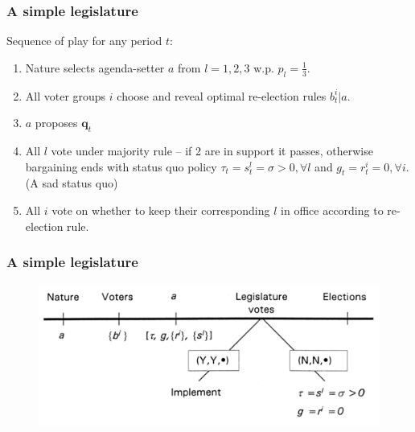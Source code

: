 \documentclass[11pt,aspectratio=169]{beamer}
\begin{document}
\begin{frame}
\frametitle{A simple legislature}


\noindent Sequence of play for any period $t$:

\begin{enumerate}
\item Nature selects agenda-setter $a$ from $l=1,2,3$ w.p. $p_l=\frac{1}{3}$. 

\item All voter groups $i$ choose and reveal optimal re-election rules $b_t^i|a$. 

\item $a$ proposes $\textbf{q}_t$

\item All $l$ vote under majority rule -- if 2 are in support it passes, otherwise bargaining ends with status quo policy $\tau_t=s^l_t=\sigma >0, \forall l$ and $g_t=r^i_t=0, \forall i$. (A sad status quo)

\item All $i$ vote on whether to keep their corresponding $l$ in office according to re-election rule.
\end{enumerate}

\end{frame}

\begin{frame}
\frametitle{A simple legislature}

\begin{figure}[h]
\begin{center}
\includegraphics[scale=0.4]{PRT.png}
\end{center}
\end{figure}

\end{frame}
\end{document}
